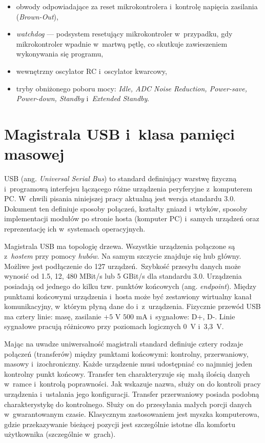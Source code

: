 \begin{itemize}
\item obwody odpowiadające za reset mikrokontrolera i~kontrolę napięcia zasilania (\mbox{\textit{Brown-Out}}),

\item \textit{watchdog} --- podsystem resetujący mikrokontroler w~przypadku, gdy mikrokontroler wpadnie w~martwą pętlę, co skutkuje zawieszeniem wykonywania się programu, 

\item wewnętrzny oscylator RC i~oscylator kwarcowy,

\item tryby obniżonego poboru mocy: \textit{Idle, ADC Noise Reduction, \mbox{Power-save}, \mbox{Power-down}, Standby} i~\textit{Extended Standby}.

\end{itemize}


\section{Magistrala USB i~klasa pamięci masowej}

USB (ang. \textit{Universal Serial Bus}) to standard definiujący warstwę fizyczną i~programową interfejsu łączącego różne urządzenia peryferyjne z~komputerem PC. W~chwili pisania niniejszej pracy aktualną jest wersja standardu 3.0. Dokument ten definiuje sposoby połączeń, kształty gniazd i~wtyków, sposoby implementacji modułów po stronie hosta (komputer PC) i~samych urządzeń oraz reprezentację ich w~systemach operacyjnych.

Magistrala USB ma topologię drzewa. Wszystkie urządzenia połączone są z~\textit{hostem} przy pomocy \textit{hubów}. Na samym szczycie znajduje się hub główny. Możliwe jest podłączenie do 127 urządzeń.~Szybkość przesyłu danych może wynosić od 1.5, 12, 480 MBit/s lub 5 GBit/s dla standardu 3.0. Urządzenia posiadają od jednego do kilku tzw. punktów końcowych (ang.  \textit{endpoint}). Między punktami końcowymi urządzenia i~hosta może być zestawiony wirtualny kanał komunikacyjny, w~którym płyną dane do i~z~urządzenia. Fizycznie przewód USB ma cztery linie: masę, zasilanie $+5$ V $500$ mA i~sygnałowe: D+, D-. Linie sygnałowe pracują różnicowo przy poziomach logicznych 0~V i~3,3~V.

Mając na uwadze uniwersalność magistrali standard definiuje cztery rodzaje połączeń (transferów) między punktami końcowymi: kontrolny, przerwaniowy, masowy i~izochroniczny. Każde urządzenie musi udostępniać co najmniej jeden kontrolny punkt końcowy. Transfer ten charakteryzuje się małą ilością danych w~ramce i~kontrolą poprawności. Jak wskazuje nazwa, służy on do kontroli pracy urządzenia i~ustalania jego konfiguracji. Transfer przerwaniowy posiada podobną charakterystykę do kontrolnego. Służy on do przesyłania małych porcji danych w~gwarantowanym czasie. Klasycznym zastosowaniem jest myszka komputerowa, gdzie przekazywanie bieżącej pozycji jest szczególnie istotne dla komfortu użytkownika (szczególnie w~grach).

